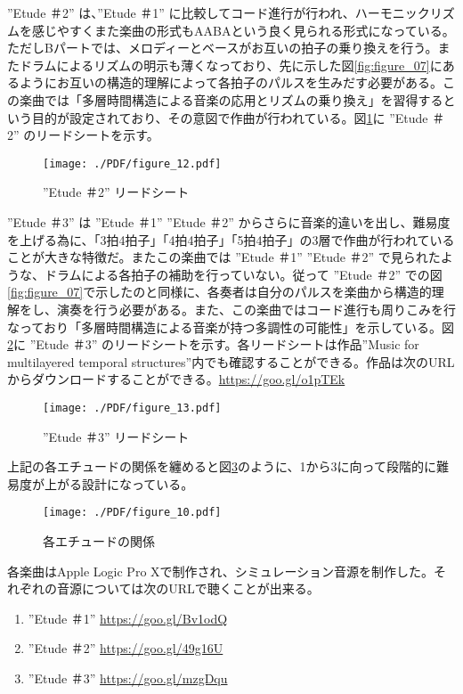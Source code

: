 \documentclass[uplatex,dvipdfmx]{ujarticle}
\begin{document}
''Etude ＃2'' は、''Etude ＃1'' に比較してコード進行が行われ、ハーモニックリズムを感じやすくまた楽曲の形式もAABAという良く見られる形式になっている。ただしBパートでは、メロディーとベースがお互いの拍子の乗り換えを行う。またドラムによるリズムの明示も薄くなっており、先に示した図\ref{fig:figure_07}にあるようにお互いの構造的理解によって各拍子のパルスを生みだす必要がある。この楽曲では「多層時間構造による音楽の応用とリズムの乗り換え」を習得するという目的が設定されており、その意図で作曲が行われている。図\ref{fig:figure_12}に ''Etude ＃2'' のリードシートを示す。

\begin{figure}[htb]
\centerline{
	\texttt{[image: ./PDF/figure\_12.pdf]}
}
\caption{''Etude ＃2'' リードシート}
\label{fig:figure_12}
\end{figure}

''Etude ＃3'' は ''Etude ＃1'' ''Etude ＃2'' からさらに音楽的違いを出し、難易度を上げる為に、「3拍4拍子」「4拍4拍子」「5拍4拍子」の3層で作曲が行われていることが大きな特徴だ。またこの楽曲では ''Etude ＃1'' ''Etude ＃2'' で見られたような、ドラムによる各拍子の補助を行っていない。従って ''Etude ＃2'' での図\ref{fig:figure_07}で示したのと同様に、各奏者は自分のパルスを楽曲から構造的理解をし、演奏を行う必要がある。また、この楽曲ではコード進行も周りこみを行なっており「多層時間構造による音楽が持つ多調性の可能性」を示している。図\ref{fig:figure_13}に ''Etude ＃3'' のリードシートを示す。各リードシートは作品''Music for multilayered temporal structures''\cite{yamato:01}内でも確認することができる。作品は次のURLからダウンロードすることができる。\url{https://goo.gl/o1pTEk}

\begin{figure}[H]
\centerline{
	\texttt{[image: ./PDF/figure\_13.pdf]}
}
\caption{''Etude ＃3'' リードシート}
\label{fig:figure_13}
\end{figure}

上記の各エチュードの関係を纏めると図\ref{fig:figure_10}のように、1から3に向って段階的に難易度が上がる設計になっている。

\begin{figure}[H]
\centerline{
	\texttt{[image: ./PDF/figure\_10.pdf]}
}
\caption{各エチュードの関係}
\label{fig:figure_10}
\end{figure}

各楽曲はApple Logic Pro Xで制作され、シミュレーション音源を制作した。それぞれの音源については次のURLで聴くことが出来る。

\begin{enumerate}
	\item ''Etude ＃1'' \url{https://goo.gl/Bv1odQ}
	\item ''Etude ＃2'' \url{https://goo.gl/49g16U}
	\item ''Etude ＃3'' \url{https://goo.gl/mzgDqu}
\end{enumerate}
\end{document}
